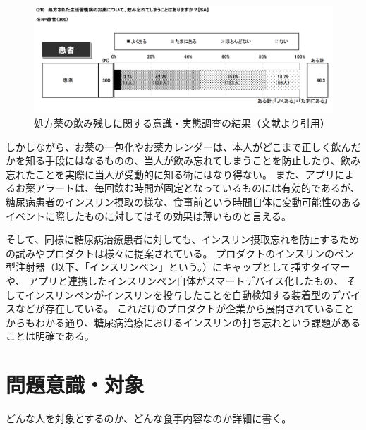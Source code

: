 \begin{figure}[htbp]
  \caption{処方薬の飲み残しに関する意識・実態調査の結果（文献\cite{drug_treatment_investigation}より引用）}
  \label{fig:forget_medicine_number}
  \begin{center}
    \includegraphics[bb=0 0 1000 400,width=15cm]{assets/forget_medicine_number.png}
  \end{center}
\end{figure}

しかしながら、お薬の一包化やお薬カレンダーは、本人がどこまで正しく飲んだかを知る手段にはなるものの、当人が飲み忘れてしまうことを防止したり、飲み忘れたことを実際に当人が受動的に知る術にはなり得ない。
また、アプリによるお薬アラートは、毎回飲む時間が固定となっているものには有効的であるが、糖尿病患者のインスリン摂取の様な、食事前という時間自体に変動可能性のあるイベントに際したものに対してはその効果は薄いものと言える。

そして、同様に糖尿病治療患者に対しても、インスリン摂取忘れを防止するための試みやプロダクトは様々に提案されている。
プロダクトのインスリンのペン型注射器（以下、「インスリンペン」という。）にキャップとして挿すタイマー\cite{timesulin}や、
アプリと連携したインスリンペン自体がスマートデバイス化したもの\cite{inpen}、
そしてインスリンペンがインスリンを投与したことを自動検知する装着型のデバイス\cite{insulcheck}などが存在している。
これだけのプロダクトが企業から展開されていることからもわかる通り、糖尿病治療におけるインスリンの打ち忘れという課題があることは明確である。

\section{問題意識・対象}

どんな人を対象とするのか、どんな食事内容なのか詳細に書く。

